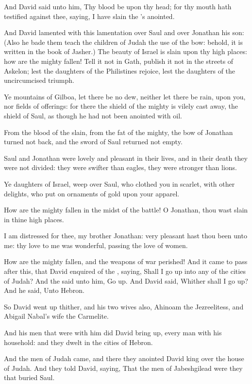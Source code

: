 \Verse And David said unto him, Thy blood be upon thy head; for thy mouth hath testified against thee, saying, I have slain the \LORD's anointed.

\Verse And David lamented with this lamentation over Saul and over Jonathan his son: \Verse (Also he bade them teach the children of Judah the use of the bow: behold, it is written in the book of Jasher.)  \Verse The beauty of Israel is slain upon thy high places: how are the mighty fallen!  \Verse Tell it not in Gath, publish it not in the streets of Askelon; lest the daughters of the Philistines rejoice, lest the daughters of the uncircumcised triumph.

\Verse Ye mountains of Gilboa, let there be no dew, neither let there be rain, upon you, nor fields of offerings: for there the shield of the mighty is vilely cast away, the shield of Saul, as though he had not been anointed with oil.

\Verse From the blood of the slain, from the fat of the mighty, the bow of Jonathan turned not back, and the sword of Saul returned not empty.

\Verse Saul and Jonathan were lovely and pleasant in their lives, and in their death they were not divided: they were swifter than eagles, they were stronger than lions.

\Verse Ye daughters of Israel, weep over Saul, who clothed you in scarlet, with other delights, who put on ornaments of gold upon your apparel.

\Verse How are the mighty fallen in the midst of the battle! O Jonathan, thou wast slain in thine high places.

\Verse I am distressed for thee, my brother Jonathan: very pleasant hast thou been unto me: thy love to me was wonderful, passing the love of women.

\Verse How are the mighty fallen, and the weapons of war perished!  
\Chapter
\Verse And it came to pass after this, that David enquired of the \LORD, saying, Shall I go up into any of the cities of Judah? And the \LORD said unto him, Go up. And David said, Whither shall I go up? And he said, Unto Hebron.

\Verse So David went up thither, and his two wives also, Ahinoam the Jezreelitess, and Abigail Nabal's wife the Carmelite.

\Verse And his men that were with him did David bring up, every man with his household: and they dwelt in the cities of Hebron.

\Verse And the men of Judah came, and there they anointed David king over the house of Judah. And they told David, saying, That the men of Jabeshgilead were they that buried Saul.

